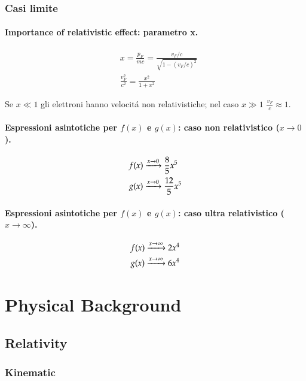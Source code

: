 \documentclass[main.tex]{subfiles}
\begin{document}
\section{Casi limite}

\subsection{Importance of relativistic effect: parametro x.}

\begin{align*}
&x=\frac{p_F}{mc}=\frac{v_F/c}{\sqrt{1-(v_F/c)^2}}\\
&\frac{v_F^2}{c^2}=\frac{x^2}{1+x^2}
\end{align*}

Se $x\ll1$ gli elettroni hanno velocit\'a non relativistiche; nel caso $x\gg1$ $\frac{v_F}{c}\approx1$.

\subsection{Espressioni asintotiche per $f(x)$ e $g(x)$: caso non relativistico ($x\to0$).}

\begin{align*}
&f(x)\xrightarrow{x\to0}\frac{8}{5}x^5\\
&g(x)\xrightarrow{x\to0}\frac{12}{5}x^5
\end{align*}

\subsection{Espressioni asintotiche per $f(x)$ e $g(x)$: caso ultra relativistico ($x\to\infty$).}

\begin{align*}
&f(x)\xrightarrow{x\to\infty}2x^4\\
&g(x)\xrightarrow{x\to\infty}6x^4
\end{align*}

\part{Physical Background}


\chapter{Relativity}
\PartialToc

\section{Kinematic}
\end{document}
